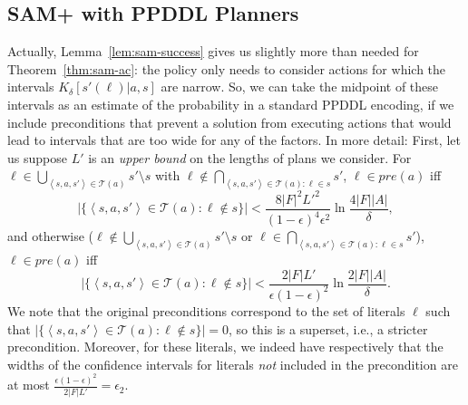 \documentclass[letterpaper]{article} %
\newcommand{\pre}{\textit{pre}}
\newcommand{\tuple}[1]{\ensuremath{\left \langle #1 \right \rangle }}
\begin{document}
\subsection{SAM+ with PPDDL Planners}
Actually, Lemma~\ref{lem:sam-success} gives us slightly more than needed for Theorem~\ref{thm:sam-ac}: the policy only needs to consider actions for which the intervals $K_\delta[s'(\ell)|a,s]$ are narrow. So, we can take the midpoint of these intervals as an estimate of the probability in a standard PPDDL encoding, if we include 
preconditions
that prevent a solution from executing actions that would lead to intervals that are too wide for any of the factors. In more detail: First, let us suppose $L'$ is an {\em upper bound} on the lengths of plans we consider. For $\ell\in\bigcup_{\tuple{s, a, s'}\in \mathcal{T}(a)} s'\setminus s $ with $\ell \notin \bigcap_{\tuple{s, a, s'}\in \mathcal{T}(a):\ell\in s}s'$, $\ell\in\pre(a)$ iff 
\begin{equation*}
|\{\tuple{s, a, s'}\in \mathcal{T}(a):\ell\notin s\}|< \frac{8|F|^2L'^2}{(1-\epsilon)^4\epsilon^2}\ln\frac{4|F||A|}{\delta},
\end{equation*}
and otherwise ($\ell\notin\bigcup_{\tuple{s, a, s'}\in \mathcal{T}(a)} s'\setminus s $ or $\ell \in \bigcap_{\tuple{s, a, s'}\in \mathcal{T}(a):\ell\in s}s'$),  $\ell\in\pre(a)$ iff 
\begin{equation*}
|\{\tuple{s, a, s'}\in \mathcal{T}(a):\ell\notin s\}|<\frac{2|F|L'}{\epsilon(1-\epsilon)^2}\ln\frac{2|F||A|}{\delta}.
\end{equation*}
We note that the original preconditions correspond to the set of literals $\ell$ such that $|\{\tuple{s, a, s'}\in \mathcal{T}(a):\ell\notin s\}|=0$, so this is a superset, i.e., a stricter precondition. Moreover, for these literals, we indeed have respectively that the widths of the confidence intervals for literals {\em not} included in the precondition are at most $\frac{\epsilon(1-\epsilon)^2}{2|F|L'}=\epsilon_2$.
\end{document}
